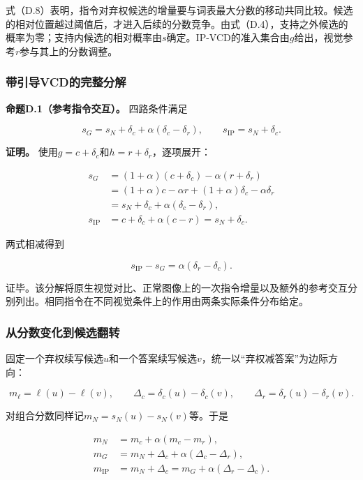 式（D.8）表明，指令对弃权候选的增量要与词表最大分数的移动共同比较。候选的相对位置越过阈值后，才进入后续的分数竞争。由式（D.4），支持之外候选的概率为零；支持内候选的相对概率由\(s\)确定。IP-VCD的准入集合由\(g\)给出，视觉参考\(r\)参与其上的分数调整。

\subsubsection{带引导VCD的完整分解}\label{ux5e26ux5f15ux5bfcvcdux7684ux5b8cux6574ux5206ux89e3}

\textbf{命题D.1（参考指令交互）。} 四路条件满足

\[
\boxed{
s_G=s_N+\delta_c+\alpha(\delta_c-\delta_r),\qquad
s_{\mathrm{IP}}=s_N+\delta_c.
}
\tag{D.10}
\]

\textbf{证明。} 使用\(g=c+\delta_c\)和\(h=r+\delta_r\)，逐项展开：

\[
\begin{aligned}
s_G
&=(1+\alpha)(c+\delta_c)-\alpha(r+\delta_r)\\
&=(1+\alpha)c-\alpha r+(1+\alpha)\delta_c-\alpha\delta_r\\
&=s_N+\delta_c+\alpha(\delta_c-\delta_r),\\
s_{\mathrm{IP}}
&=c+\delta_c+\alpha(c-r)
=s_N+\delta_c.
\end{aligned}
\tag{D.11}
\]

两式相减得到

\[
s_{\mathrm{IP}}-s_G=\alpha(\delta_r-\delta_c).
\tag{D.12}
\]

证毕。该分解将原生视觉对比、正常图像上的一次指令增量以及额外的参考交互分别列出。相同指令在不同视觉条件上的作用由两条实际条件分布给定。

\subsubsection{从分数变化到候选翻转}\label{ux4eceux5206ux6570ux53d8ux5316ux5230ux5019ux9009ux7ffbux8f6c}

固定一个弃权续写候选\(u\)和一个答案续写候选\(v\)，统一以``弃权减答案''为边际方向：

\[
m_\ell=\ell(u)-\ell(v),\qquad
\Delta_c=\delta_c(u)-\delta_c(v),\qquad
\Delta_r=\delta_r(u)-\delta_r(v).
\tag{D.13}
\]

对组合分数同样记\(m_N=s_N(u)-s_N(v)\)等。于是

\[
\begin{aligned}
m_N&=m_c+\alpha(m_c-m_r),\\
m_G&=m_N+\Delta_c+\alpha(\Delta_c-\Delta_r),\\
m_{\mathrm{IP}}&=m_N+\Delta_c
=m_G+\alpha(\Delta_r-\Delta_c).
\end{aligned}
\tag{D.14}
\]

